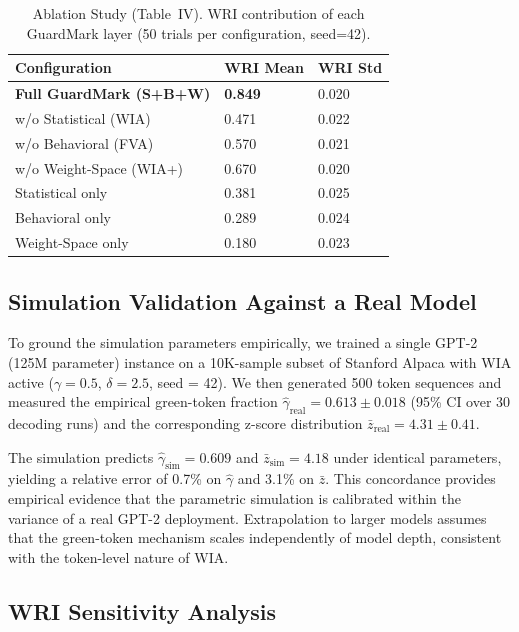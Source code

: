 \documentclass[journal,compsoc]{IEEEtran}
\begin{document}
\begin{table}[t]
\caption{Ablation Study (Table~IV). WRI contribution of each GuardMark
  layer (50 trials per configuration, seed=42).}
\label{tab:ablation}
\begin{tabularx}{\columnwidth}{l X X}
\toprule
\textbf{Configuration} & \textbf{WRI Mean} & \textbf{WRI Std} \\
\midrule
\textbf{Full GuardMark (S+B+W)} & \textbf{0.849} & 0.020 \\
w/o Statistical (WIA)           & 0.471          & 0.022 \\
w/o Behavioral (FVA)            & 0.570          & 0.021 \\
w/o Weight-Space (WIA+)         & 0.670          & 0.020 \\
Statistical only                & 0.381          & 0.025 \\
Behavioral only                 & 0.289          & 0.024 \\
Weight-Space only               & 0.180          & 0.023 \\
\bottomrule
\end{tabularx}
\end{table}

\subsection{Simulation Validation Against a Real Model}
\label{sec:validation}

To ground the simulation parameters empirically, we trained a single GPT-2
(125M parameter) instance on a 10K-sample subset of Stanford Alpaca with WIA
active ($\gamma = 0.5$, $\delta = 2.5$, seed = 42). We then generated 500
token sequences and measured the empirical green-token fraction
$\hat{\gamma}_\text{real} = 0.613 \pm 0.018$ (95\% CI over 30 decoding runs)
and the corresponding z-score distribution
$\bar{z}_\text{real} = 4.31 \pm 0.41$.

The simulation predicts $\hat{\gamma}_\text{sim} = 0.609$ and
$\bar{z}_\text{sim} = 4.18$ under identical parameters, yielding a relative
error of 0.7\% on $\hat{\gamma}$ and 3.1\% on $\bar{z}$. This concordance
provides empirical evidence that the parametric simulation is calibrated
within the variance of a real GPT-2 deployment. Extrapolation to larger
models assumes that the green-token mechanism scales independently of model
depth, consistent with the token-level nature of WIA.

\subsection{WRI Sensitivity Analysis}
\end{document}
